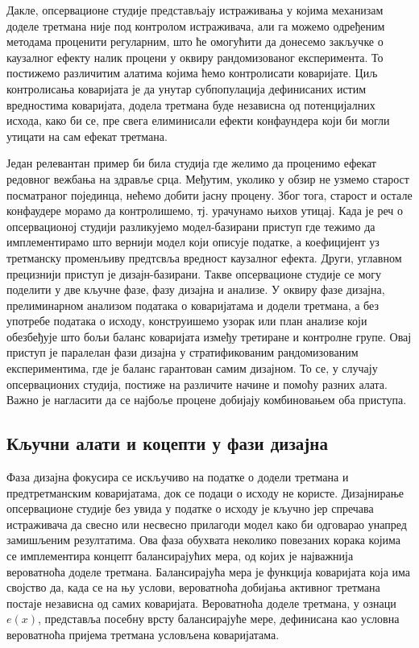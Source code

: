 \documentclass[12pt, a4paper]{article}
\begin{document}
Дакле, опсервационе студије представљају истраживања у којима механизам доделе третмана није под контролом истраживача, али га можемо одређеним методама проценити регуларним, што ће омогућити да донесемо закључке о каузалног ефекту налик процени у оквиру рандомизованог експеримента. То постижемо различитим алатима којима ћемо контролисати коваријате. Циљ контролисања коваријата је да унутар субпопулација дефинисаних истим вредностима коваријата, додела третмана буде независна од потенцијалних исхода, како би се, пре свега елиминисали ефекти конфаундера који би могли утицати на сам ефекат третмана.

Један релевантан пример би била студија где желимо да проценимо ефекат редовног вежбања на здравље срца. Међутим, уколико у обзир не узмемо старост посматраног појединца, нећемо добити јасну процену. Због тога, старост и остале конфаудере морамо да контролишемо, тј. урачунамо њихов утицај. 
Када је реч о опсервационој студији разликујемо модел-базирани приступ где тежимо да имплементирамо што вернији модел који описује податке, а коефицијент уз третманску променљиву предтсвља вредност каузалног ефекта. Други, углавном прецизнији приступ је дизајн-базирани. Такве опсервационе студије се могу поделити у две кључне фазе, фазу дизајна и анализе. У оквиру фазе дизајна, прелиминарном анализом података о коваријатама и додели третмана, а без употребе података о исходу, конструишемо узорак или план анализе који обезбеђује што бољи баланс коваријата између третиране и контролне групе. Овај приступ је паралелан фази дизајна у стратификованим рандомизованим експериментима, где је баланс гарантован самим дизајном. То се, у случају опсервационих студија, постиже на различите начине и помоћу разних алата. 
Важно је нагласити да се најбоље процене добијају комбиновањем оба приступа.
\subsection*{Кључни алати и коцепти у фази дизајна}
Фаза дизајна фокусира се искључиво на податке о додели третмана и предтретманским коваријатама, док се подаци о исходу не користе. Дизајнирање опсервационе студије без увида у податке о исходу је кључно јер спречава истраживача да свесно или несвесно прилагоди модел како би одговарао унапред замишљеним резултатима. Ова фаза обухвата неколико повезаних корака којима се имплементира концепт балансирајућих мера, од којих је најважнија вероватноћа доделе третмана. Балансирајућа мера је функција коваријата која има својство да, када се на њу услови, вероватноћа добијања активног третмана постаје независна од самих коваријата. Вероватноћа доделе третмана, у ознаци $e(x)$, представља посебну врсту балансирајуће мере, дефинисана као условна вероватноћа пријема третмана условљена коваријатама.  
\end{document}
